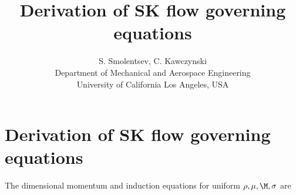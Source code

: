 \documentclass[11pt]{article}
\begin{document}
\doublespacing
\title{Derivation of SK flow governing equations}
\author{S. Smolentsev, C. Kawczynski \\
Department of Mechanical and Aerospace Engineering \\
University of California Los Angeles, USA\\
}
\maketitle

\section{Derivation of SK flow governing equations}

The dimensional momentum and induction equations for uniform $\rho,\mu,\M,\sigma$ are
\end{document}
